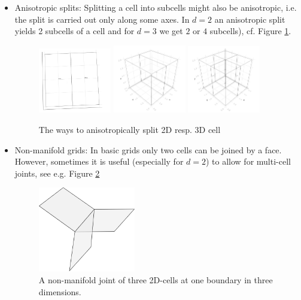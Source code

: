 \documentclass{article}
\begin{document}
\begin{itemize}
    \item Anisotropic splits: Splitting a cell into subcells might also be anisotropic, i.e. the split is carried out only along some axes. In $d=2$ an anisotropic split yields 2 subcells of a cell and for $d=3$ we get $2$ or $4$ subcells), cf. Figure \ref{anisotroicsplit}.
    \begin{figure}[h!]
\centering
\includegraphics[width=0.3\textwidth]{images/2Dsplit-anisotropic.png}
\includegraphics[width=0.3\textwidth]{images/3Dsplit-anisotropic-1.png}
\includegraphics[width=0.3\textwidth]{images/3Dsplit-anisotropic-2.png}
\caption{The ways to anisotropically split 2D resp. 3D cell}\label{anisotroicsplit}
\end{figure}
    \item Non-manifold grids: In basic grids only two cells can be joined by a face. However, sometimes it is useful (especially for $d=2$) to allow for multi-cell joints, see e.g. Figure \ref{nonmf} 
     \begin{figure}[h!]
\centering
\includegraphics[width=0.4\textwidth]{images/non-manifold.png}
\caption{A non-manifold joint of three 2D-cells at one boundary in three dimensions.}\label{nonmf}
\end{figure}
    

\end{itemize}
\end{document}
